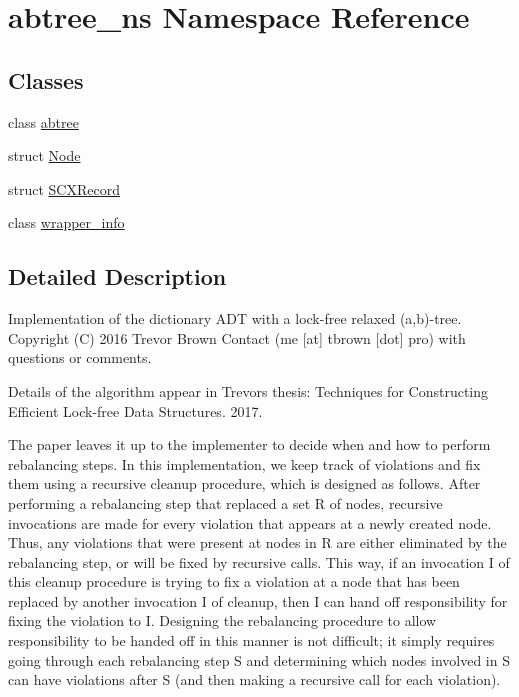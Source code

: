 \hypertarget{namespaceabtree__ns}{}\section{abtree\+\_\+ns Namespace Reference}
\label{namespaceabtree__ns}
\subsection*{Classes}
\begin{DoxyCompactItemize}
\item 
class \hyperlink{classabtree__ns_1_1abtree}{abtree}
\item 
struct \hyperlink{structabtree__ns_1_1Node}{Node}
\item 
struct \hyperlink{structabtree__ns_1_1SCXRecord}{S\+C\+X\+Record}
\item 
class \hyperlink{classabtree__ns_1_1wrapper__info}{wrapper\+\_\+info}
\end{DoxyCompactItemize}


\subsection{Detailed Description}
Implementation of the dictionary A\+DT with a lock-\/free relaxed (a,b)-\/tree. Copyright (C) 2016 Trevor Brown Contact (me \mbox{[}at\mbox{]} tbrown \mbox{[}dot\mbox{]} pro) with questions or comments.

Details of the algorithm appear in Trevor\textquotesingle{}s thesis\+: Techniques for Constructing Efficient Lock-\/free Data Structures. 2017.

The paper leaves it up to the implementer to decide when and how to perform rebalancing steps. In this implementation, we keep track of violations and fix them using a recursive cleanup procedure, which is designed as follows. After performing a rebalancing step that replaced a set R of nodes, recursive invocations are made for every violation that appears at a newly created node. Thus, any violations that were present at nodes in R are either eliminated by the rebalancing step, or will be fixed by recursive calls. This way, if an invocation I of this cleanup procedure is trying to fix a violation at a node that has been replaced by another invocation I\textquotesingle{} of cleanup, then I can hand off responsibility for fixing the violation to I\textquotesingle{}. Designing the rebalancing procedure to allow responsibility to be handed off in this manner is not difficult; it simply requires going through each rebalancing step S and determining which nodes involved in S can have violations after S (and then making a recursive call for each violation). 



